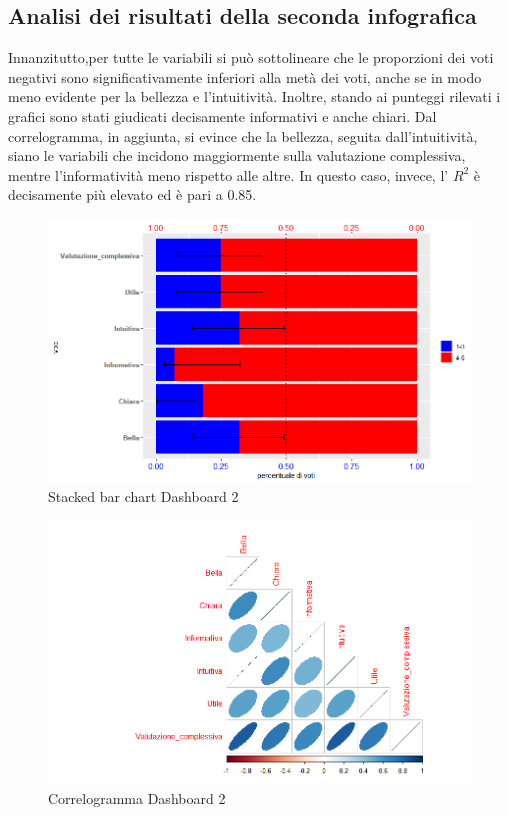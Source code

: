 \documentclass[12pt]{article}
\begin{document}
\subsection{Analisi dei risultati della seconda infografica}
Innanzitutto,per tutte le variabili si può sottolineare che le proporzioni
dei voti negativi sono significativamente inferiori alla metà dei voti, anche se in modo meno evidente per la bellezza e l'intuitività. Inoltre, stando ai punteggi rilevati i grafici sono stati giudicati decisamente informativi e anche chiari.
Dal correlogramma, in aggiunta, si evince che la bellezza, seguita dall'intuitività, siano le variabili che incidono maggiormente sulla valutazione complessiva, mentre l'informatività meno rispetto alle altre. In questo caso, invece, l' $R^2$ è decisamente più elevato ed è pari a 0.85.
\begin{figure}[H]
    \centering
    \includegraphics[scale = 0.55]{img/Questionari/StackedBarplot_2.png}
    \caption{Stacked bar chart Dashboard 2}
\end{figure}


\begin{figure}[H]
    \hspace{20pt}
    \vspace{-20pt}
    \includegraphics[scale = 0.6]{img/Questionari/Correlogramma_2.png}
    \caption{Correlogramma Dashboard 2}
\end{figure}
\end{document}
